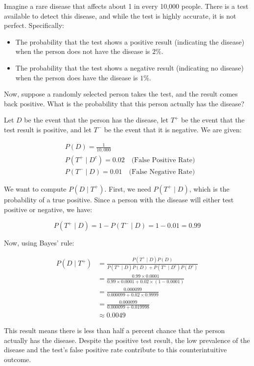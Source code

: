 \begin{example}\par

   Imagine a rare disease that affects about 1 in every 10,000 people. There is a test available to detect this disease, and while the test is highly accurate, it is not perfect. Specifically:
\begin{itemize}
    \item The probability that the test shows a positive result (indicating the disease) when the person does not have the disease is $2 \%$.
    \item The probability that the test shows a negative result (indicating no disease) when the person does have the disease is $1 \%$.
\end{itemize}

Now, suppose a randomly selected person takes the test, and the result comes back positive. What is the probability that this person actually has the disease?
\end{example}

\begin{solution}
    Let \( D \) be the event that the person has the disease, let \( T^+ \) be the event that the test result is positive, and let \( T^- \) be the event that it is negative. We are given:

\[
\begin{aligned}
& P(D) = \frac{1}{10,000} \\
& P\left(T^+ \mid D^c\right) = 0.02 \quad \text{(False Positive Rate)} \\
& P\left(T^- \mid D\right) = 0.01 \quad \text{(False Negative Rate)}
\end{aligned}
\]

We want to compute \( P(D \mid T^+) \). First, we need \( P(T^+ \mid D) \), which is the probability of a true positive. Since a person with the disease will either test positive or negative, we have:

\[
P(T^+ \mid D) = 1 - P(T^- \mid D) = 1 - 0.01 = 0.99
\]

Now, using Bayes' rule:

\[
\begin{aligned}
P(D \mid T^+) &= \frac{P(T^+ \mid D) P(D)}{P(T^+ \mid D) P(D) + P\left(T^+ \mid D^c\right) P\left(D^c\right)} \\
&= \frac{0.99 \times 0.0001}{0.99 \times 0.0001 + 0.02 \times (1 - 0.0001)} \\
&= \frac{0.000099}{0.000099 + 0.02 \times 0.9999} \\
&= \frac{0.000099}{0.000099 + 0.019998} \\
&\approx 0.0049
\end{aligned}
\]

This result means there is less than half a percent chance that the person actually has the disease. Despite the positive test result, the low prevalence of the disease and the test's false positive rate contribute to this counterintuitive outcome.
\leavevmode\end{solution}

